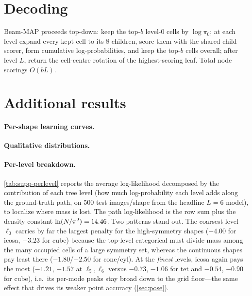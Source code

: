 \section{Decoding}
\label{sec:supp-decode}

Beam-MAP proceeds top-down: keep the top-$b$ level-0 cells by $\log\pi_0$; at each
level expand every kept cell to its $8$ children, score them with the shared child
scorer, form cumulative log-probabilities, and keep the top-$b$ cells overall;
after level $L$, return the cell-centre rotation of the highest-scoring leaf. Total
node scorings $O(bL)$. 

\section{Additional results}
\label{sec:supp-results}

\paragraph{Per-shape learning curves.}

\paragraph{Qualitative distributions.}

\paragraph{Per-level breakdown.}
\cref{tab:supp-perlevel} reports the average log-likelihood decomposed by the
contribution of each tree level (how much log-probability each level adds along the
ground-truth path, on $500$ test images/shape from the headline $L{=}6$ model), to
localize where mass is lost. The path log-likelihood is the row sum plus the
density constant $\ln(N/\pi^2)=14.46$. Two patterns stand out. The coarsest level
$\ell_0$ carries by far the largest penalty for the high-symmetry shapes
($-4.00$ for icosa, $-3.23$ for cube) because the top-level categorical must divide
mass among the many occupied cells of a large symmetry set, whereas the continuous
shapes pay least there ($-1.80$/$-2.50$ for cone/cyl). At the \emph{finest} levels,
icosa again pays the most ($-1.21$, $-1.57$ at $\ell_5,\ell_6$ versus $-0.73$,
$-1.06$ for tet and $-0.54$, $-0.90$ for cube), i.e.\ its per-mode peaks stay broad
down to the grid floor---the same effect that drives its weaker point accuracy
(\cref{sec:pose}).

